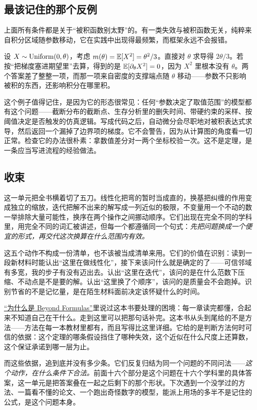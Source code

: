 \subsection{最该记住的那个反例}

上面所有条件都是关于``被积函数别太野''的。有一类失效与被积函数无关，纯粹来自积分区域随参数移动，它在实践中出现得最频繁，而框架永远不会报错。

设 \(X\sim\operatorname{Uniform}(0,\theta)\)，考虑 \(m(\theta)=\mathbb{E}[X^{2}]=\theta^{2}/3\)。直接对 \(\theta\) 求导得 \(2\theta/3\)。若按``把梯度塞进期望里''去算，得到的是 \(\mathbb{E}[\partial_\theta X^{2}]=0\)，因为 \(X^{2}\) 里根本没有 \(\theta\)。两个答案差了整整一项，而那一项来自密度的支撑端点随 \(\theta\) 移动——参数不只影响被积的东西，还影响积分在哪里积。

这个例子值得记住，是因为它的形态很常见：任何``参数决定了取值范围''的模型都有这个问题——截断分布的截断点、生存分析里的删失时间、带硬约束的采样、按阈值决定是否触发的仿真逻辑。写成代码之后，自动微分会尽职地对被积表达式求导，然后返回一个漏掉了边界项的梯度。它不会警告，因为从计算图的角度看一切正常。检查它的办法很朴素：拿数值差分对一两个坐标校验一次。这不是定理，是一条应当写进流程的经验做法。

\subsection{收束}

这一单元把全书横着切了五刀。线性化把弯的暂时当成直的，换基把纠缠的作用变成独立的缩放，迭代把解不出来的解写成一列近似的极限，不变量用一个不动的数一举排除大量可能性，换序在两个操作之间挪动顺序。它们出现在完全不同的学科里，用完全不同的词汇被讲述，但每一个都遵循同一个句式：\emph{先把问题换成一个便宜的形式，再交代这次换算在什么范围内有效。}

这五个动作不构成一份清单，也不该被当成清单来用。它们的价值在识别：读到一段新材料时能认出``这里在做线性化''，接下来该问什么就是确定的了——可信邻域有多宽，我的步子有没有迈出去。认出``这里在迭代''，该问的是在什么范数下压缩、不动点是不是要的解。认出``这里换了个顺序''，该问的是质量会不会跑掉。识别节省的不是记忆量，是在陌生材料面前决定该怀疑什么的时间。

\hyperref[ch:001]{``为什么是 Beyond Formulas''}里说过这本书要处理的困境：每一章读完都懂，合起来不知道自己在干什么。走到这里可以把那句话补完。这本书从头到尾给的不是方法——方法在每一本教材里都有，而且写得比这里详细。它给的是判断方法何时可信的依据：这个定理的哪条假设挡住了哪种失效，这个近似在什么尺度上还算数，这个保证承诺到哪一层为止。

而这些依据，追到底并没有多少条。它们反复归结为同一个问题的不同问法——\emph{这个动作，在什么条件下合法。}前面十六个部分是这个问题在十六个学科里的具体答案，这一单元是把答案叠在一起之后剩下的那个形状。下次遇到一个没学过的方法、一篇看不懂的论文、一个跑出奇怪数字的模型，能派上用场的多半不是记住的公式，是这个问题本身。
